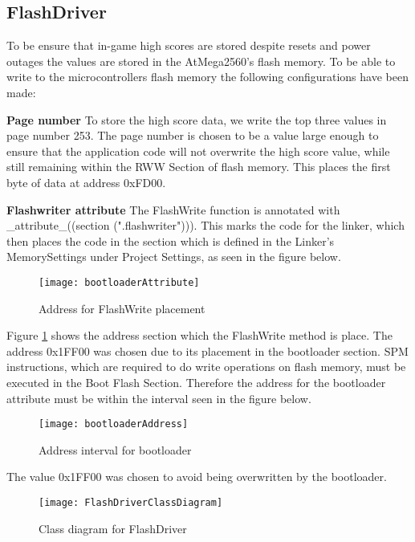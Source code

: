 \subsection{FlashDriver}
	To be ensure that in-game high scores are stored despite resets and power outages the values are stored in the AtMega2560's flash memory. To be able to write to the microcontrollers flash memory the following configurations have been made:
	
	\textbf{Page number} \newline
		To store the high score data, we write the top three values in page number 253. The page number is chosen to be a value large enough to ensure that the application code will not overwrite the high score value, while still remaining within the RWW Section of flash memory. This places the first byte of data at address 0xFD00.
	
	\textbf{Flashwriter attribute} \newline
		The FlashWrite function is annotated with \_attribute\_((section (".flashwriter"))). This marks the code for the linker, which then places the code in the  section which is defined in the Linker's MemorySettings under Project Settings, as seen in the figure below.
		
			\begin{figure}[H]
				\centering
				\texttt{[image: bootloaderAttribute]}
				\caption{Address for FlashWrite placement}
				\label{fig:flashwriter}
			\end{figure}
		
		Figure \ref{fig:flashwriter} shows the address section which the FlashWrite method is place. The address 0x1FF00 was chosen due to its placement in the bootloader section. SPM instructions, which are required to do write operations on flash memory, must be executed in the Boot Flash Section. Therefore the address for the bootloader attribute must be within the interval seen in the figure below.
		
			\begin{figure}[H]
				\centering
				\texttt{[image: bootloaderAddress]}
				\caption{Address interval for bootloader}
				\label{fig:bootloaderAddress}
			\end{figure}
	
		The value 0x1FF00 was chosen to avoid being overwritten by the bootloader.

			\begin{figure}[H]
				\centering
				\texttt{[image: FlashDriverClassDiagram]}
				\caption{Class diagram for FlashDriver}
				\label{fig:FlashDriverClassDiagram}
			\end{figure}	

